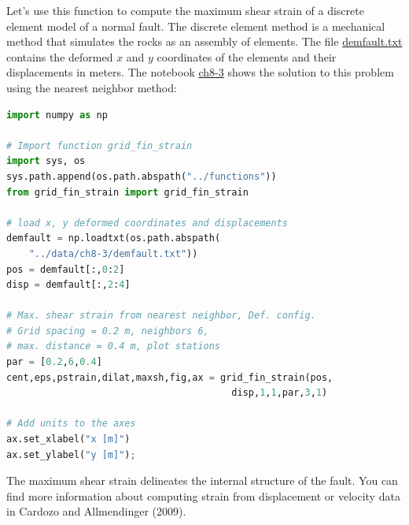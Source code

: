 \documentclass[a4paper , 12pt]{book}
\begin{document}
Let's use this function to compute the maximum shear strain of a discrete element model of a normal fault. The discrete element method is a mechanical method that simulates the rocks as an assembly of elements. The file \href{https://github.com/nfcd/compGeo/blob/master/source/data/ch8-3/demfault.txt}{demfault.txt} contains the deformed $x$ and $y$ coordinates of the elements and their displacements in meters. The notebook \href{https://github.com/nfcd/compGeo/blob/master/source/notebooks/ch8-3.ipynb}{ch8-3} shows the solution to this problem using the nearest neighbor method:

\begin{center}
\begin{lstlisting}[language=Python, frame=single]
import numpy as np

# Import function grid_fin_strain
import sys, os
sys.path.append(os.path.abspath("../functions"))
from grid_fin_strain import grid_fin_strain

# load x, y deformed coordinates and displacements
demfault = np.loadtxt(os.path.abspath(
    "../data/ch8-3/demfault.txt"))
pos = demfault[:,0:2]
disp = demfault[:,2:4]

# Max. shear strain from nearest neighbor, Def. config. 
# Grid spacing = 0.2 m, neighbors 6, 
# max. distance = 0.4 m, plot stations
par = [0.2,6,0.4]
cent,eps,pstrain,dilat,maxsh,fig,ax = grid_fin_strain(pos,
                                        disp,1,1,par,3,1)

# Add units to the axes
ax.set_xlabel("x [m]")
ax.set_ylabel("y [m]");
\end{lstlisting}
\end{center}

The maximum shear strain delineates the internal structure of the fault. You can find more information about computing strain from displacement or velocity data in Cardozo and Allmendinger (2009).
\end{document}

